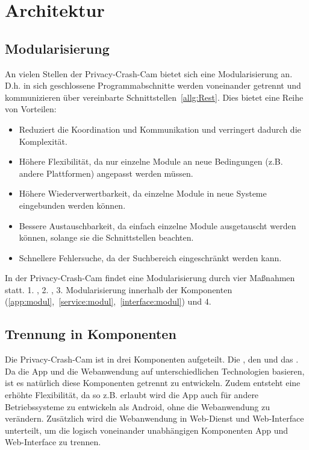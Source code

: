 \chapter{Architektur}
\section{Modularisierung}
An vielen Stellen der Privacy-Crash-Cam bietet sich eine Modularisierung an. D.h. in sich geschlossene Programmabschnitte werden voneinander getrennt und kommunizieren über vereinbarte Schnittstellen~\eqref{allg:Rest}. Dies bietet eine Reihe von Vorteilen:
\begin{itemize}
\itemsep0pt
\item Reduziert die Koordination und Kommunikation und verringert dadurch die Komplexität.
\item Höhere Flexibilität, da nur einzelne Module an neue Bedingungen (z.B. andere Plattformen) angepasst werden müssen.
\item Höhere Wiederverwertbarkeit, da einzelne Module in neue Systeme eingebunden werden können.
\item Bessere Austauschbarkeit, da einfach einzelne Module ausgetauscht werden können, solange sie die Schnittstellen beachten.
\item Schnellere Fehlersuche, da der Suchbereich eingeschränkt werden kann.
\end{itemize}

In der Privacy-Crash-Cam findet eine Modularisierung durch vier Maßnahmen statt. 1. , 2. , 3. Modularisierung innerhalb der Komponenten (\eqref{app:modul},~\eqref{service:modul},~\eqref{interface:modul}) und 4. 

\section{Trennung in Komponenten} \label{allg:Komponenten}

Die Privacy-Crash-Cam ist in drei Komponenten aufgeteilt. Die , den  und das . \newline
Da die App und die Webanwendung auf unterschiedlichen Technologien basieren, ist es natürlich diese Komponenten getrennt zu entwickeln. Zudem entsteht eine erhöhte Flexibilität, da so z.B. erlaubt wird die App auch für andere Betriebssysteme zu entwickeln als Android, ohne die Webanwendung zu verändern. \newline
Zusätzlich wird die Webanwendung in Web-Dienst und Web-Interface unterteilt, um die logisch voneinander unabhängigen Komponenten App und Web-Interface zu trennen.


